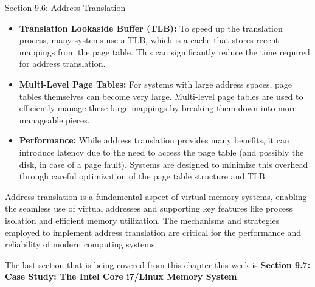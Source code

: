 \begin{notes}{Section 9.6: Address Translation}
    \begin{itemize}
        \item \textbf{Translation Lookaside Buffer (TLB):} To speed up the translation process, many systems use a TLB, which is a cache that stores recent mappings from the page table. This can 
        significantly reduce the time required for address translation.
        \item \textbf{Multi-Level Page Tables:} For systems with large address spaces, page tables themselves can become very large. Multi-level page tables are used to efficiently manage these large 
        mappings by breaking them down into more manageable pieces.
        \item \textbf{Performance:} While address translation provides many benefits, it can introduce latency due to the need to access the page table (and possibly the disk, in case of a page fault). 
        Systems are designed to minimize this overhead through careful optimization of the page table structure and TLB.
    \end{itemize}
    
    Address translation is a fundamental aspect of virtual memory systems, enabling the seamless use of virtual addresses and supporting key features like process isolation and efficient memory 
    utilization. The mechanisms and strategies employed to implement address translation are critical for the performance and reliability of modern computing systems.    
\end{notes}

The last section that is being covered from this chapter this week is \textbf{Section 9.7: Case Study: The Intel Core i7/Linux Memory System}.

